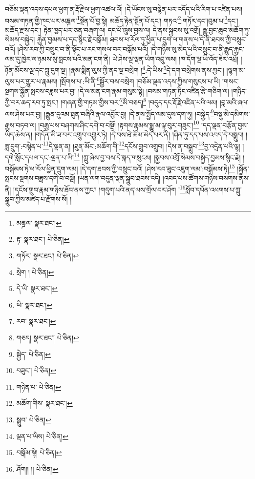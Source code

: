 \setcounter{footnote}{0} 
བཅོམ་ལྡན་འདས་དཔལ་ཕྱག་ན་རྡོ་རྗེ་ལ་ཕྱག་འཚལ་ལོ། །དེ་ཡོངས་སུ་བསྙེན་པར་འདོད་པའི་རིག་པ་འཛིན་པས། བསམ་གཏན་གྱི་ཁང་པར་མཎྜལ་\footnote{མནྜལ་  སྣར་ཐང་། }སྔོན་པོ་བྱ་སྟེ། མཆོད་རྟེན་སྔོན་པོ་དང་། གཏའ་\footnote{རྟ་  སྣར་ཐང་།  པེ་ཅིན། }:གཏོར་དང་།བུམ་པ་\footnote{གཏོར་  སྣར་ཐང་།  པེ་ཅིན། }དང་། མཆོད་རྫས་དང་། རྟེན་ཁྱད་པར་ཅན་བཞག་ལ། དང་པོ་ཁྲུས་བྱས་ལ། དེ་ནས་སྐྱབས་སུ་འགྲོ། རྒྱུ་བྱང་ཆུབ་མཆོག་ཏུ་སེམས་བསྐྱེད། རྐྱེན་བྱམས་པ་དང་སྙིང་རྗེ་བསྒོམ། ཐབས་ཕ་རོལ་ཏུ་ཕྱིན་པ་དྲུག་ལ་གནས་པ་དེ་ནི་ཐབས་ཀྱི་བསྲུང་བའོ། །ཤེས་རབ་ཀྱི་བསྲུང་བ་ནི་སྟོང་པ་རང་གསལ་བར་བསྒོམ་པའོ། །དེ་གཉིས་སུ་མེད་པའི་བསྲུང་བ་ནི་རྒྱུད་རྐྱང་ལམ་དུ་ཁྱེར་ལ་ཉམས་སུ་བླངས་པའི་མན་ངག་ནི། ཡེ་ཤེས་ལྔ་ལྡན་ཡིག་འབྲུ་ལས། །ཁ་དོག་ལྔ་ཡི་འོད་ཟེར་འཕྲོ། །ཉོན་མོངས་ལྔ་དང་ཀླུ་དུག་ལྔ། །རྣམ་སྨིན་ལུས་ཀྱི་ནད་ལྔ་བསྲེག །\footnote{སྲེག །  པེ་ཅིན། }:དེ་ཡིས་\footnote{དེ་ཡི་  སྣར་ཐང་། }དེ་དག་བསྲེགས་ནས་ཀྱང་། །ལྷག་མ་ལུས་པར་གྱུར་པ་རྣམས། །སྤོགས་པ་:ཡི་ནི་\footnote{ཡི་  སྣར་ཐང་། }སྦྱོར་བས་བསྲེག །བཅོམ་ལྡན་འདས་ཀྱིས་གསུངས་པ་ཡི། །གསང་སྔགས་སྐྱོན་སྤངས་བཟླས་པར་བྱ། །དེ་ལ་མན་ངག་རྣམ་གསུམ་སྟེ། །བསམ་གཏན་ཏིང་འཛིན་རྩེ་གཅིག་ལ། །གཉིད་ཀྱི་བར་ཆད་རབ་ཏུ་སྤང་། །གཞན་གྱི་གཏམ་གྱིས་བར་\footnote{རབ་  སྣར་ཐང་། }མི་བཅད།\footnote{གཅད།  སྣར་ཐང་།  པེ་ཅིན། } །བདུད་དང་རྡོ་རྗེ་འཛིན་པའི་ལམ། །བླ་མའི་ཞལ་ལས་ཤེས་པར་བྱ། །རྒྱུན་དུའམ་ཐུན་བཞིའི་རྣལ་འབྱོར་བྱ། །དེ་ནས་སྤྱོད་ལམ་དུས་དག་ཏུ། །བསྐྱེད་\footnote{སྐྱེད་  པེ་ཅིན། }བསྡུ་མི་དམིགས་རྒྱས་བཏབ་ལ། །བརྒྱ་པས་བཤགས་ཤིང་དགེ་བ་བསྔོ། །རྟགས་རྣམས་སྒྱུ་མ་ལྟ་བུར་གཟུང་།\footnote{བཟུང་།  པེ་ཅིན། } །དད་ལྡན་བརྩོན་བྱས་ཡིད་ཆེས་ན། །གདོན་མི་ཟ་བར་འགྲུབ་འགྱུར་ཏེ། །དེ་བས་ཐེ་ཚོམ་མེད་པར་ནི། །ཤིན་ཏུ་དད་པས་འབད་དེ་བསྒྲུབ། །ཟླ་དྲུག་:བསྙེན་པ་\footnote{གཉེན་པ་  པེ་ཅིན། }དེ་ལྡན་ན། །ཐུན་མོང་:མཆོག་གི་\footnote{མཆོག་གིས་  སྣར་ཐང་། }དངོས་གྲུབ་འགྲུབ། །དེས་ན་བསྒྲུབ་\footnote{སྒྲུབ་  པེ་ཅིན། }བྱ་འདྲེན་པའི་ལྷ། །དགེ་སློང་དཔལ་དང་:ལྡན་པ་ཡི།\footnote{ལྡན་པ་ཡིས།  པེ་ཅིན། } །ཀླུ་ཞེས་བྱ་བས་དེ་སྐད་གསུངས། །སྐྱབས་འགྲོ་སེམས་བསྐྱེད་བྱམས་སྙིང་རྗེ། །བསྒོམས་ཏེ་ཕ་རོལ་ཕྱིན་དྲུག་ལམ། །དེ་དག་ཐབས་ཀྱི་བསྲུང་བའོ། །ཤེས་རབ་ཟུང་འཇུག་ལམ་:བསྒོམས་ཏེ།\footnote{བསྒོམ་སྟེ།  པེ་ཅིན། } །སྐྱོན་སྤངས་སྔགས་བཟླས་དགེ་བ་བསྔོ། །ཡན་ལག་བདུན་ལྡན་སྒྲུབ་ཐབས་འདི། །འབད་པས་ཚོགས་གཉིས་བསགས་ནས་ནི། །དངོས་གྲུབ་རྣམ་གཉིས་ཐོབ་ནས་ཀྱང་། །གདུག་པའི་ནད་ལས་གྲོལ་བར་ཤོག ་\footnote{ཤོག།། །།  པེ་ཅིན། }སློབ་དཔོན་འཕགས་པ་ཀླུ་སྒྲུབ་ཀྱིས་མཛད་པ་རྫོགས་སོ། ། 